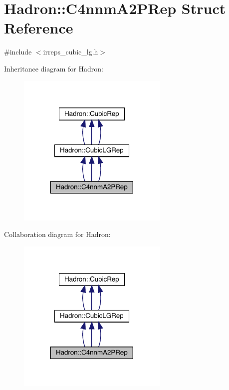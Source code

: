 \hypertarget{structHadron_1_1C4nnmA2PRep}{}\section{Hadron\+:\+:C4nnm\+A2\+P\+Rep Struct Reference}
\label{structHadron_1_1C4nnmA2PRep}


{\ttfamily \#include $<$irreps\+\_\+cubic\+\_\+lg.\+h$>$}



Inheritance diagram for Hadron\+:
\nopagebreak
\begin{figure}[H]
\begin{center}
\leavevmode
\includegraphics[width=204pt]{d2/d94/structHadron_1_1C4nnmA2PRep__inherit__graph}
\end{center}
\end{figure}


Collaboration diagram for Hadron\+:
\nopagebreak
\begin{figure}[H]
\begin{center}
\leavevmode
\includegraphics[width=204pt]{df/d92/structHadron_1_1C4nnmA2PRep__coll__graph}
\end{center}
\end{figure}
